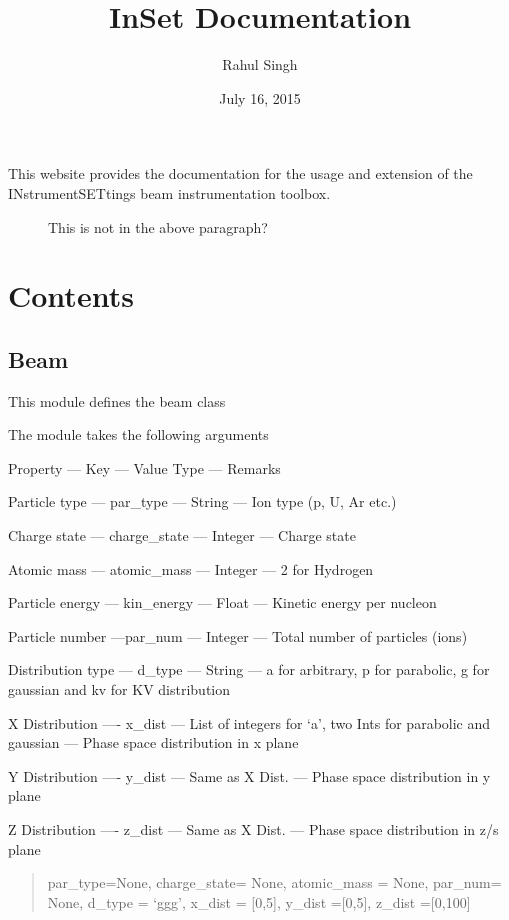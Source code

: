 \documentclass[letterpaper,10pt,english]{sphinxmanual}
\title{InSet Documentation}
\date{July 16, 2015}
\author{Rahul Singh}
\begin{document}
\maketitle
\tableofcontents
{}\label{index::doc}

\begin{description}
\item[{This website provides the documentation for the usage and extension of the INstrumentSETtings beam instrumentation toolbox.}] \leavevmode
This is not in the above paragraph?

\end{description}


\chapter{Contents}
\label{index:index-label}\label{index:welcome-to-inset}\label{index:contents}

\section{Beam}
\label{beam:module-beam}\label{beam:beam}\label{beam::doc}\label{beam:beam-label}
This module defines the beam class

The module takes the following arguments

Property --- Key --- Value Type --- Remarks

Particle type --- par\_type --- String --- Ion type (p, U, Ar etc.)

Charge state --- charge\_state --- Integer --- Charge state

Atomic mass --- atomic\_mass ---  Integer --- 2 for Hydrogen

Particle energy --- kin\_energy --- Float --- Kinetic energy per nucleon

Particle number ---par\_num --- Integer --- Total number of particles (ions)

Distribution type --- d\_type --- String --- a for arbitrary, p for parabolic, g for gaussian and kv for KV distribution

X Distribution ---- x\_dist --- List of integers for `a', two Ints for parabolic and gaussian --- Phase space distribution in x plane

Y Distribution ---- y\_dist --- Same as X Dist. --- Phase space distribution in y plane

Z Distribution ---- z\_dist --- Same as X Dist. --- Phase space distribution in z/s plane
\begin{quote}

par\_type=None, charge\_state= None, atomic\_mass = None, par\_num= None, d\_type = `ggg', x\_dist = {[}0,5{]}, y\_dist ={[}0,5{]}, z\_dist ={[}0,100{]}
\end{quote}
\end{document}
